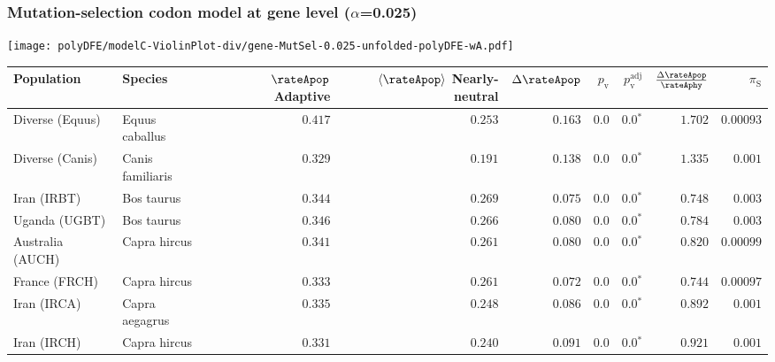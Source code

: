 \subsubsection*{Mutation-selection codon model at gene level ($\alpha$=0.025)}
\begin{center}
    \texttt{[image: polyDFE/modelC-ViolinPlot-div/gene-MutSel-0.025-unfolded-polyDFE-wA.pdf]}
    \begin{adjustbox}{width = 1\textwidth}
        \begin{tabular}{|l|l|r|r|r|r|r|r|r|}
            \toprule
            Population & Species & \specialcell{$\rateApop$ \\ Adaptive}                & \specialcell{$\left< \rateApop \right>$ \\ Nearly-neutral}                & $\Delta \rateApop $    & $p_{\mathrm{v}}$ & $p_{\mathrm{v}}^{\mathrm{adj}}$ & $\frac{\Delta\rateApop}{\rateAphy}$ & $\pi_{\textrm{S}}$ \\
            \midrule
            Diverse (Equus)                    & Equus caballus          & $ 0.417$ & $ 0.253$ & $ 0.163$ & $0.0$ & $\bm{0.0{^*}}$ & $ 1.702$ & $0.00093$  \\
            Diverse (Canis)                  & Canis familiaris          & $ 0.329$ & $ 0.191$ & $ 0.138$ & $0.0$ & $\bm{0.0{^*}}$ & $ 1.335$ & $ 0.001$ \\
            Iran (IRBT)               & Bos taurus        & $ 0.344$ & $ 0.269$ & $ 0.075$ & $0.0$ & $\bm{0.0{^*}}$ & $ 0.748$ & $ 0.003$ \\
            Uganda (UGBT)                  & Bos taurus        & $ 0.346$ & $ 0.266$ & $ 0.080$ & $0.0$ & $\bm{0.0{^*}}$ & $ 0.784$ & $ 0.003$ \\
            Australia (AUCH)                    & Capra hircus      & $ 0.341$ & $ 0.261$ & $ 0.080$ & $0.0$ & $\bm{0.0{^*}}$ & $ 0.820$ & $0.00099$ \\
            France (FRCH)                    & Capra hircus        & $ 0.333$ & $ 0.261$ & $ 0.072$ & $0.0$ & $\bm{0.0{^*}}$ & $ 0.744$ & $0.00097$ \\
            Iran (IRCA)                   & Capra aegagrus        & $ 0.335$ & $ 0.248$ & $ 0.086$ & $0.0$ & $\bm{0.0{^*}}$ & $ 0.892$ & $ 0.001$ \\
            Iran (IRCH)                 & Capra hircus        & $ 0.331$ & $ 0.240$ & $ 0.091$ & $0.0$ & $\bm{0.0{^*}}$ & $ 0.921$ & $ 0.001$ \\

\end{tabular}
\end{adjustbox}
\end{center}
